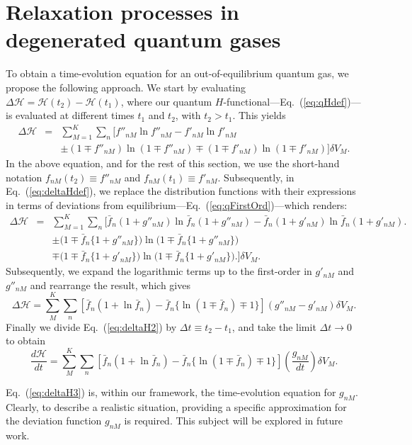 \section{Relaxation processes in degenerated quantum gases}\label{sec:relaxproc}

To obtain a time-evolution equation for an out-of-equilibrium quantum gas,
we propose the following approach. We start by evaluating $\Delta\mathcal{H}=
\mathcal{H}(t_2)-\mathcal{H}(t_1)$,
where our quantum $H$-functional---Eq.~(\ref{eq:qHdef})---is evaluated at different times $t_1$ and $t_2$, with
$t_2 > t_1$. This yields
%
\begin{eqnarray}\label{eq:deltaHdef}
	\Delta\mathcal H &=& \sum_{M=1}^{K}\sum_n [f''_{nM} \ln f''_{nM} - f'_{nM}	\ln f'_{nM}\nonumber \\ 
			&&\pm (1\mp f''_{nM}) \ln(1\mp f''_{nM}) \mp (1\mp f'_{nM}) \ln (1\mp f'_{nM})]\delta V_M. 
\end{eqnarray}
%
In the above equation, and for the rest of this section, we use the short-hand notation
$f_{nM}(t_2)\equiv f''_{nM}$ and 
$f_{nM}(t_1) \equiv f'_{nM}$.
Subsequently, in Eq.~(\ref{eq:deltaHdef}), we replace the distribution functions with their expressions in terms
of deviations from equilibrium---Eq.~(\ref{eq:qFirstOrd})---which renders:
\begin{eqnarray}\label{eq:deltaH1}
	\Delta\mathcal H &=& \sum_{M=1}^{K} \sum_n\Big[\bar{f}_n(1+g''_{nM}) \ln \bar{f}_{n}(1+g''_{nM})  -  
			\bar{f}_n(1+g'_{nM}) \ln \bar{f}_n(1+g'_{nM})\Big. \nonumber \\
		    &&  \pm \big(1 \mp \bar{f}_n \{1+g''_{nM}\}\big) \ln \big(1\mp \bar{f}_n\{1+g''_{nM} \}\big)\nonumber \\
		    &&  \mp \big(1\mp \bar{f}_n \{ 1+g'_{nM} \}\big) \ln\big(1\mp \bar{f}_n \{1+g'_{nM} \}\big)\Big.\Big]
		    \delta V_M.
\end{eqnarray}
Subsequently, we expand the logarithmic terms up to the first-order in $g'_{nM}$ and $g''_{nM}$
and rearrange the result, which gives
%
\begin{equation}\label{eq:deltaH2}
\Delta\mathcal H = \sum_{M}^{K}\sum_n [\bar{f}_n(1
	+\ln \bar{f}_n)-\bar{f}_n \{\ln(1\mp \bar{f}_n)\mp 1 \}](g''_{nM}-g'_{nM})\delta V_M.
\end{equation}
%
Finally we divide Eq.~(\ref{eq:deltaH2}) by $\Delta t\equiv t_2-t_1$, and take the limit
$\Delta t\to0$ to obtain
%
\begin{equation}\label{eq:deltaH3}
\frac{d\mathcal H}{dt} = \sum_{M}^{K}\sum_n [\bar{f}_n(1
	+\ln \bar{f}_n)-\bar{f}_n \{\ln(1\mp \bar{f}_n)\mp 1 \}]\left(\frac{g_{nM}}{dt}\right)\delta V_M.
\end{equation}
%

Eq.~(\ref{eq:deltaH3}) is, within our framework, the time-evolution equation for $g_{nM}$.
Clearly, to describe a realistic situation, providing a specific approximation for the deviation function $g_{nM}$ is required. This subject will be explored in future work.

